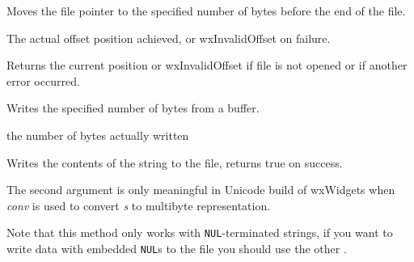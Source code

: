 Moves the file pointer to the specified number of bytes before the end of the file.




The actual offset position achieved, or wxInvalidOffset on failure.

\label{wxfiletell}


Returns the current position or wxInvalidOffset if file is not opened or if another
error occurred.

\label{wxfilewrite}


Writes the specified number of bytes from a buffer.





the number of bytes actually written

\label{wxfilewrites}


Writes the contents of the string to the file, returns true on success.

The second argument is only meaningful in Unicode build of wxWidgets when
{\it conv} is used to convert {\it s} to multibyte representation.

Note that this method only works with {\tt NUL}-terminated strings, if you want
to write data with embedded {\tt NUL}s to the file you should use the other 
.

